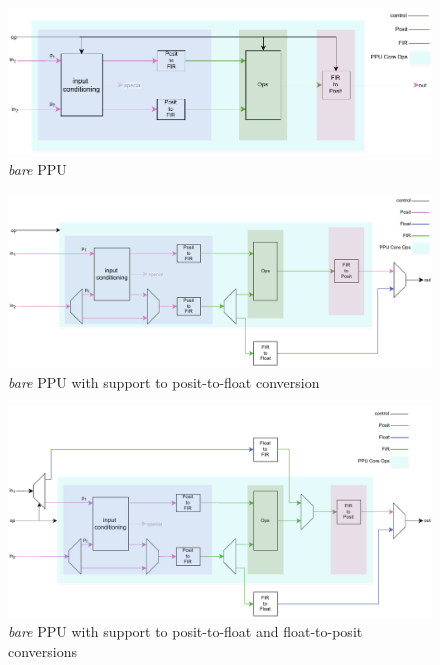 \begin{figure}
        \centering
        \includegraphics[width=1\textwidth]{figures/top_no_conversions.pdf}
        \caption{\textit{bare} PPU}
\end{figure}
\begin{figure}
        \includegraphics[width=1\textwidth]{figures/top_P2F.pdf}
        \caption{\textit{bare} PPU with support to posit-to-float conversion}
        \label{fig:top_p2f_00000001}
\end{figure}
\begin{figure}
        \includegraphics[width=1\textwidth]{figures/top_all.pdf}
        \caption{\textit{bare} PPU with support to posit-to-float and float-to-posit conversions}
\end{figure}



